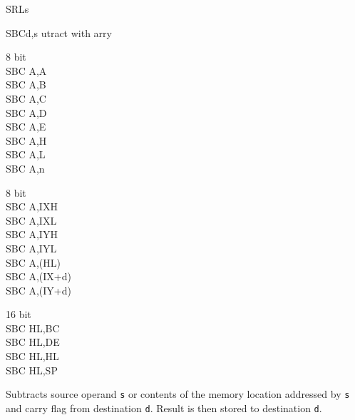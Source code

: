 \begin{basedescript}{
	\desclabelstyle{\multilinelabel}
	\desclabelwidth{3cm}}
\begin{DetailItem}{SRL}{s}
		\begin{DetailTiming}
		\end{DetailTiming}

	\end{DetailItem}

	\pagebreak


	\begin{DetailItem}{SBC}{d,s}
		{utract with arry}
		{}
	
		\begin{DetailVariants}
			\textnormal{8 bit}\\
			SBC A,A\\
			SBC A,B\\
			SBC A,C\\
			SBC A,D\\
			SBC A,E\\
			SBC A,H\\
			SBC A,L\\
			SBC A,n

			\columnbreak
			\textnormal{8 bit}\\
			SBC A,IXH\UNDOC\\
			SBC A,IXL\UNDOC\\
			SBC A,IYH\UNDOC\\
			SBC A,IYL\UNDOC\\
			SBC A,(HL)\\
			SBC A,(IX+d)\\
			SBC A,(IY+d)

			\columnbreak
			\textnormal{16 bit}\\
			SBC HL,BC\\
			SBC HL,DE\\
			SBC HL,HL\\
			SBC HL,SP
		\end{DetailVariants}
		
		Subtracts source operand {\tt s} or contents of the memory location addressed by {\tt s} and carry flag \FlagCF{} from destination {\tt d}. Result is then stored to destination {\tt d}.


\end{DetailItem}
\end{basedescript}
